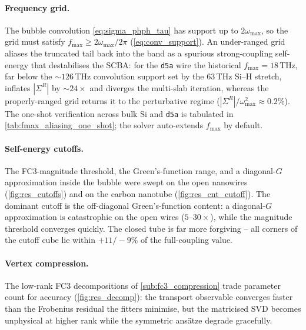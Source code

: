 \paragraph{Frequency grid.}
The bubble convolution \cref{eq:sigma_phph_tau} has support up to
$2\omega_{\max}$, so the grid must satisfy $f_{\max}\ge2\omega_{\max}/2\pi$
(\cref{eq:conv_support}). An under-ranged grid aliases the truncated tail back
into the band as a spurious strong-coupling self-energy that destabilises the
SCBA: for the \texttt{d5a} wire the historical $f_{\max}=18$\,THz, far below the
$\sim126$\,THz convolution support set by the $63$\,THz Si--H stretch, inflates
$|\Sigma^R|$ by $\sim24\times$ and diverges the multi-slab iteration, whereas the
properly-ranged grid returns it to the
perturbative regime ($|\Sigma^R|/\omega_{\max}^2\approx0.2\%$). The one-shot
verification across bulk Si and \texttt{d5a} is tabulated in
\cref{tab:fmax_aliasing_one_shot}; the solver auto-extends $f_{\max}$ by default.

\paragraph{Self-energy cutoffs.}
The FC3-magnitude threshold, the Green's-function range, and a diagonal-$G$
approximation inside the bubble were swept on the open nanowires
(\cref{fig:res_cutoffs}) and on the carbon nanotube (\cref{fig:res_cnt_cutoff}).
The dominant cutoff is the off-diagonal Green's-function content: a diagonal-$G$
approximation is catastrophic on the open wires ($5$--$30\times$), while the
magnitude threshold converges quickly. The closed tube is far more forgiving --
all corners of the cutoff cube lie within $+11/{-}9\%$ of the full-coupling value.

\paragraph{Vertex compression.}
The low-rank FC3 decompositions of \cref{sub:fc3_compression} trade parameter count
for accuracy (\cref{fig:res_decomp}): the transport observable converges faster
than the Frobenius residual the fitters minimise, but the matricised SVD becomes
unphysical at higher rank while the symmetric ans\"atze degrade gracefully.

